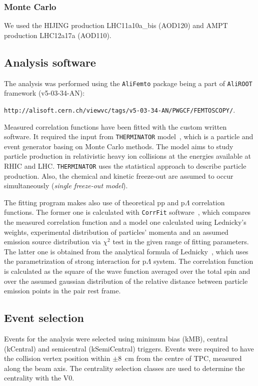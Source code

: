 \subsubsection{Monte Carlo}
We used the HIJING production LHC11a10a\_bis (AOD120) and AMPT production LHC12a17a (AOD110).
\subsection{Analysis software}
The analysis was performed using the \verb|AliFemto| package being a part of \verb|AliROOT| framework (v5-03-34-AN):

\verb|http://alisoft.cern.ch/viewvc/tags/v5-03-34-AN/PWGCF/FEMTOSCOPY/|.

Measured correlation functions have been fitted with the custom written software. It required the input from \verb|THERMINATOR| model~\cite{therminator}, which is a particle and event generator basing on Monte Carlo methods. The model aims to study particle production in relativistic heavy ion collisions at the energies available at RHIC and LHC. \verb|THERMINATOR| uses the statistical approach to describe particle production. Also, the chemical and kinetic freeze-out are assumed to occur simultaneously (\emph{single freeze-out model}).

The fitting program makes also use of theoretical pp and p$\Lambda$ correlation functions. The former one is calculated with \verb|CorrFit| software~\cite{corrfit}, which compares the measured correlation function and a model one calculated using Lednicky's weights, experimental distribution of particles' momenta and an assumed emission source distribution via $\chi^2$ test in the given range of fitting parameters. The latter one is obtained from the analytical formula of Lednicky~\cite{LednickyDirac}, which uses the parametrization of strong interaction for p$\Lambda$ system. The correlation function is calculated as the square of the wave function averaged over the total spin and over the assumed gaussian distribution of the relative distance between particle emission points in the pair rest frame.

\subsection{Event selection}
Events for the analysis were selected using minimum bias (kMB), central (kCentral) and semicentral (kSemiCentral) triggers. Events were required to have the collision vertex position within $\pm 8$~cm from the centre of TPC, measured along the beam axis. The centrality selection classes are used to determine the centrality with the V0.

